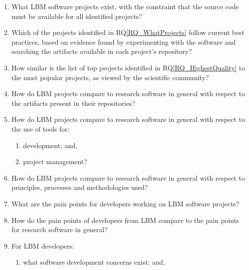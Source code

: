 \documentclass[final, 3p, times, authoryear]{elsarticle}
\newcounter{rqnum} %
\newcommand{\rqref}[1]{RQ\ref{#1}}
\begin{document}
\begin{enumerate}
	\item[RQ\refstepcounter{rqnum}\therqnum \label{RQ_WhatProjects}:] What LBM
	software projects exist, with the constraint that the source code must be
	available for all identified projects?
	\item [RQ\refstepcounter{rqnum}\therqnum \label{RQ_HighestQuality}:] Which
	of the projects identified in \rqref{RQ_WhatProjects} follow current best
	practices, based on evidence found by experimenting with the software and
	searching the artifacts available in each project's repository?
	\item [RQ\refstepcounter{rqnum}\therqnum \label{RQ_CompareHQ2Popular}:] How
	similar is the list of top projects identified in \rqref{RQ_HighestQuality}
	to the most popular projects, as viewed by the scientific community?
    \item [RQ\refstepcounter{rqnum}\therqnum \label{RQ_CompareArtifacts}:] How
	do LBM projects compare to research software in general with respect to
	the artifacts present in their repositories?
	\item [RQ\refstepcounter{rqnum}\therqnum \label{RQ_CompareToolsProjMngmnt}:]
	How do LBM projects compare to research software in general with
	respect to the use of tools for:
	\begin{enumerate} 
		\item [\rqref{RQ_CompareToolsProjMngmnt}.a] development; and,
		\item [\rqref{RQ_CompareToolsProjMngmnt}.b] project management?
	\end{enumerate}
	\item [RQ\refstepcounter{rqnum}\therqnum \label{RQ_CompareMethodologies}:]
	How do LBM projects compare to research software in general with respect to
	principles, processes and methodologies used?
	\item [RQ\refstepcounter{rqnum}\therqnum \label{RQ_PainPoints}:] What are
	the pain points for developers working on LBM software projects? 
	\item [RQ\refstepcounter{rqnum}\therqnum \label{RQ_ComparePainPoints}:] How
	do the pain points of developers from LBM compare to the pain points
	for research software in general?
	\item [RQ\refstepcounter{rqnum}\therqnum \label{RQ_Concerns}:] For LBM
	developers:
	\begin{enumerate} 
		\item [\rqref{RQ_Concerns}.a] what software development concerns exist; and,

\end{enumerate}
\end{enumerate}
\end{document}

